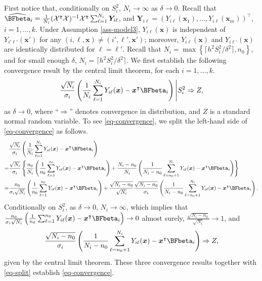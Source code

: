 \documentclass[ijoc,nonblindrev]{informs3}
\def\bx{{\bm x}}
\def\bY{{\bm Y}}
\def\cX{{\mathcal X}}
\begin{document}
First notice that, conditionally on $S_i^2$, $N_i \to  \infty$ as $\delta \to  0$.
Recall that $\widehat{\BFbeta}_i = \frac{1}{N_i} (\cX^\intercal \cX)^{-1} \cX^\intercal \sum_{\ell=1}^{N_i} \bY_{i\ell}$,
and $\bY_{i\ell}=(Y_{i\ell}(\bx_1),\ldots,Y_{i\ell}(\bx_m))^\intercal$, $i=1,\ldots,k$.
Under Assumption \ref{ass-model3}, $Y_{i\ell}(\bx)$ is independent of $Y_{i'\ell'}(\bx')$ for any $(i,\ell,\bx)\neq (i',\ell',\bx')$; moreover,  $Y_{i\ell}(\bx)$ and $Y_{i\ell'}(\bx)$ are identically distributed for $\ell=\ell'$.
Recall that $N_i = \max \left\{\lceil h^2 S_i^2/\delta^2\rceil, n_0 \right\}$,
and for small enough $\delta$, $N_i = \lceil h^2 S_i^2/\delta^2\rceil$.
We first establish the following convergence result by the central limit theorem, for each $i=1,\ldots,k$.
\begin{equation}\label{eq-convergence}
\frac{\sqrt{N_i}}{\sigma_i} \left(\frac{1}{N_i}\sum_{\ell=1}^{N_i} Y_{i\ell}(\bx) - \bx^\intercal \BFbeta_i \right) \Bigg| S_i^2 \Rightarrow  Z,
\end{equation}
as $\delta \to  0$, where ``$\Rightarrow $'' denotes convergence in distribution, and $Z$ is a standard normal random variable.
To see \eqref{eq-convergence}, we split the left-hand side of  \eqref{eq-convergence} as follows.
\begin{align}
&\frac{\sqrt{N_i}}{\sigma_i} \left(\frac{1}{N_i}\sum_{\ell=1}^{N_i} Y_{i\ell}(\bx) - \bx^\intercal \BFbeta_i \right) \nonumber\\
= &\frac{\sqrt{N_i}}{\sigma_i} \left\{\frac{n_0}{N_i} \left(\frac{1}{n_0}\sum_{\ell=1}^{n_0} Y_{i\ell}(\bx) - \bx^\intercal \BFbeta_i\right)  + \frac{N_i-n_0}{N_i} \left( \frac{1}{N_i-n_0}\sum_{\ell=n_0+1}^{N_i} Y_{i\ell}(\bx) - \bx^\intercal \BFbeta_i \right) \right\} \nonumber\\
= & \frac{n_0}{\sigma_i \sqrt{N_i}} \left(\frac{1}{n_0}\sum_{\ell=1}^{n_0} Y_{i\ell}(\bx) - \bx^\intercal \BFbeta_i\right)  + \frac{\sqrt{N_i-n_0}}{\sqrt{N_i}} \frac{\sqrt{N_i-n_0}}{\sigma_i} \left( \frac{1}{N_i-n_0}\sum_{\ell=n_0+1}^{N_i} Y_{i\ell}(\bx) - \bx^\intercal \BFbeta_i \right). \label{eq-split}
\end{align}
Conditionally on $S_i^2$, as $\delta \to 0$, $N_i \to \infty$, which implies that
$\frac{n_0}{\sigma_i \sqrt{N_i}} \left(\frac{1}{n_0}\sum_{\ell=1}^{n_0} Y_{i\ell}(\bx) - \bx^\intercal \BFbeta_i\right) \to 0$ almost surely,
$\frac{\sqrt{N_i-n_0}}{\sqrt{N_i}} \to 1$, and
$$\frac{\sqrt{N_i-n_0}}{\sigma_i} \left( \frac{1}{N_i-n_0}\sum_{\ell=n_0+1}^{N_i} Y_{i\ell}(\bx) - \bx^\intercal \BFbeta_i \right) \Rightarrow  Z,$$
given by the central limit theorem.
These three convergence results together with \eqref{eq-split} establish \eqref{eq-convergence}.
\end{document}
